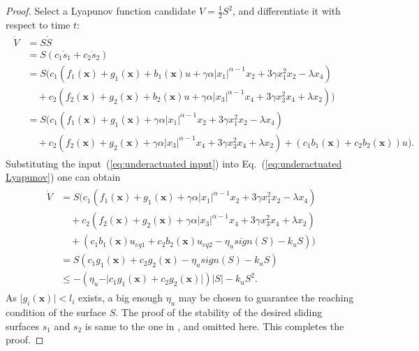 \documentclass[3p]{elsarticle}
\theoremstyle{plain}
\theoremstyle{remark}
\begin{document}
\begin{proof}
Select a Lyapunov function candidate $V=\frac{1}{2}S^2$, and differentiate it with respect to time $t$:
\begin{align}
\begin{split}
\dot V &= S\dot S\\ &= S(c_1\dot s_1+c_2\dot s_2)\\
&=S(c_1(f_1(\bm x)+g_1(\bm x)+b_1(\bm x)u+\gamma\alpha\vert x_1\vert^{\alpha-1}x_2+3\gamma x_1^2x_2-\lambda x_4)\\
&\quad+c_2(f_2(\bm x)+g_2(\bm x)+b_2(\bm x)u+\gamma\alpha\vert x_3\vert^{\alpha-1}x_4+3\gamma x_3^2x_4+\lambda x_2))\\
&=S(c_1(f_1(\bm x)+g_1(\bm x)+\gamma\alpha\vert x_1\vert^{\alpha-1}x_2+3\gamma x_1^2x_2-\lambda x_4)\\
&\quad+c_2(f_2(\bm x)+g_2(\bm x)+\gamma\alpha\vert x_3\vert^{\alpha-1}x_4+3\gamma x_3^2x_4+\lambda x_2)+(c_1b_1(\bm x)+c_2b_2(\bm x))u).\label{eq:underactuated Lyapunov}
\end{split}
\end{align}
Substituting the input~(\ref{eq:underactuated input}) into Eq.~(\ref{eq:underactuated Lyapunov}) one can obtain
\begin{align}
\begin{split}
\dot V &= S(c_1(f_1(\bm x)+g_1(\bm x)+\gamma\alpha\vert x_1\vert^{\alpha-1}x_2+3\gamma x_1^2x_2-\lambda x_4)\\
&\quad+c_2(f_2(\bm x)+g_2(\bm x)+\gamma\alpha\vert x_3\vert^{\alpha-1}x_4+3\gamma x_3^2x_4+\lambda x_2)\\
&\quad+(c_1b_1(\bm x)u_{eq1}+c_2b_2(\bm x)u_{eq2}-\eta_u sign(S)-k_u S))\\
&= S(c_1g_1(\bm x)+c_2g_2(\bm x)-\eta_u sign(S)-k_u S)\\
&\le -(\eta_u -\vert c_1g_1(\bm x)+c_2g_2(\bm x)\vert)\vert S\vert-k_u S^2.
\end{split}
\end{align}
As $\vert g_i(\bm x)\vert<l_i$ exists, a big enough $\eta_u$ may be chosen to guarantee the reaching condition of the surface $S$. The proof of the stability of the desired sliding surfaces $s_1$ and $s_2$ is same to the one in \cite{wang2004design}, and omitted here. This completes the proof.
\end{proof}
\end{document}
